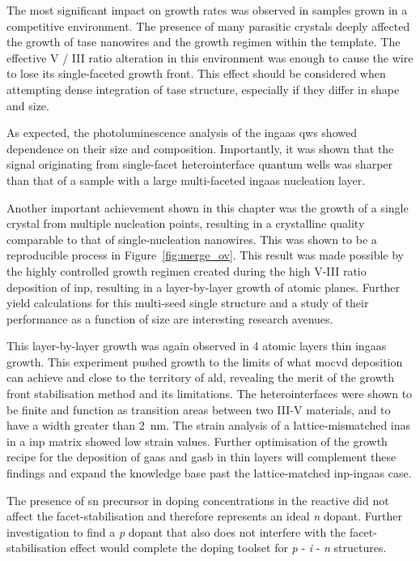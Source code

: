 The most significant impact on growth rates was observed in samples grown in a competitive environment. The presence of many parasitic crystals deeply affected the growth of \acs{tase} nanowires and the growth regimen within the template. The effective V / III ratio alteration in this environment was enough to cause the wire to lose its single-faceted growth front. This effect should be considered when attempting dense integration of \acs{tase} structure, especially if they differ in shape and size.

As expected, the photoluminescence analysis of the \acs{ingaas} \acs{qw}s showed dependence on their size and composition. Importantly, it was shown that the signal originating from  single-facet heterointerface quantum wells was sharper than that of a sample with a large multi-faceted \acs{ingaas} nucleation layer.

Another important achievement shown in this chapter was the growth of a single crystal from multiple nucleation points, resulting in a crystalline quality comparable to that of single-nucleation nanowires. This was shown to be a reproducible process in Figure~\ref{fig:merge_ov}. This result was made possible by the highly controlled growth regimen created during the high V-III ratio deposition of \acs{inp}, resulting in a layer-by-layer growth of  atomic planes. Further yield calculations for this multi-seed single structure and a study of their performance as a function of size are interesting research avenues. 

This layer-by-layer growth was again observed in 4 atomic layers thin \acs{ingaas} growth. This experiment pushed growth to the limits of what \acs{mocvd} deposition can achieve and close to the territory of \acs{ald}, revealing the merit of the growth front stabilisation method and its limitations. The heterointerfaces were shown to be finite and function as transition areas between two III-V materials, and to have a width greater than \qty{2}{\nano\metre}. The strain analysis of a lattice-mismatched \acs{inas} in a \acs{inp} matrix showed low strain values. Further optimisation of the growth recipe for the deposition of \acs{gaas} and \acs{gasb} in thin layers will complement these findings and expand the knowledge base past the lattice-matched \acs{inp}-\acs{ingaas} case.

The presence of \acl{sn} precursor in doping concentrations in the reactive did not affect the facet-stabilisation and therefore represents an ideal \textit{n} dopant. Further investigation to find a \textit{p} dopant that also does not interfere with the facet-stabilisation effect would complete the doping toolset for \textit{p} - \textit{i} - \textit{n} structures.

